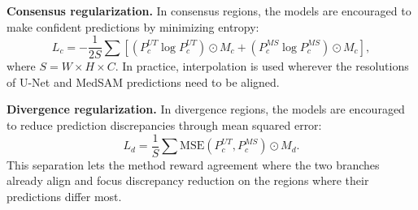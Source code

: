 \textbf{Consensus regularization.} In consensus regions, the models are encouraged to make confident predictions by minimizing entropy:
\begin{equation}
L_c=-\frac{1}{2S}\sum\left[(P^{UT}_c\log P^{UT}_c)\odot M_c+(P^{MS}_c\log P^{MS}_c)\odot M_c\right],
\label{eq:consensus_loss}
\end{equation}
where $S=W\times H\times C$. In practice, interpolation is used wherever the resolutions of U-Net and MedSAM predictions need to be aligned.

\textbf{Divergence regularization.} In divergence regions, the models are encouraged to reduce prediction discrepancies through mean squared error:
\begin{equation}
L_d=\frac{1}{S}\sum \mathrm{MSE}(P^{UT}_c,P^{MS}_c)\odot M_d.
\label{eq:divergence_loss}
\end{equation}
This separation lets the method reward agreement where the two branches already align and focus discrepancy reduction on the regions where their predictions differ most.
